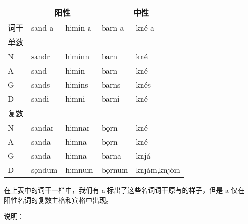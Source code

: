 \begin{longtable}{lllll}
  \toprule
     & \multicolumn{2}{c}{阳性} & \multicolumn{2}{c}{中性}                        \\
  \midrule
  \endhead
  \bottomrule
  \endfoot
  词干 & sand-a-                & himin-a-               & barn-a & kné-a       \\
  单数 &                        &                        &        &             \\
  N  & sandr                  & himinn                 & barn   & kné         \\
  A  & sand                   & himin                  & barn   & kné         \\
  G  & sands                  & himins                 & barns  & knés        \\
  D  & sandi                  & himni                  & barni  & kné         \\
  复数 &                        &                        &        &             \\
  N  & sandar                 & himnar                 & bǫrn   & kné         \\
  A  & sanda                  & himna                  & bǫrn   & kné         \\
  G  & sanda                  & himna                  & barna  & knjá        \\
  D  & sǫndum                 & himnum                 & bǫrnum & knjám,knjóm \\
\end{longtable}

在上表中的词干一栏中，我们有-a-标出了这些名词词干原有的样子，但是-a-仅在阳性名词的复数主格和宾格中出现。

说明：


